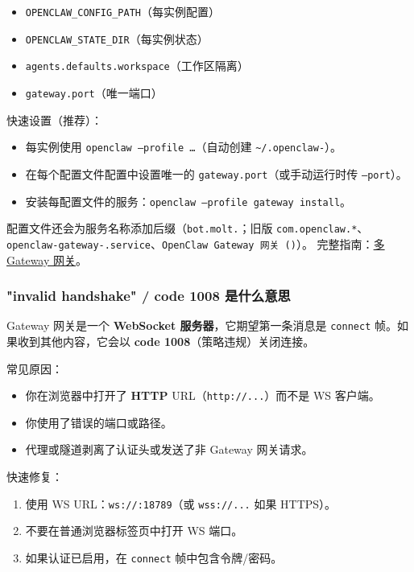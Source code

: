 \begin{itemize}
  \item \texttt{OPENCLAW\_CONFIG\_PATH}（每实例配置）
  \item \texttt{OPENCLAW\_STATE\_DIR}（每实例状态）
  \item \texttt{agents.defaults.workspace}（工作区隔离）
  \item \texttt{gateway.port}（唯一端口）
\end{itemize}


快速设置（推荐）：

\begin{itemize}
  \item 每实例使用 \texttt{openclaw --profile  …}（自动创建 \texttt{\textasciitilde{}/.openclaw-}）。
  \item 在每个配置文件配置中设置唯一的 \texttt{gateway.port}（或手动运行时传 \texttt{--port}）。
  \item 安装每配置文件的服务：\texttt{openclaw --profile  gateway install}。
\end{itemize}


配置文件还会为服务名称添加后缀（\texttt{bot.molt.}；旧版 \texttt{com.openclaw.*}、\texttt{openclaw-gateway-.service}、\texttt{OpenClaw Gateway 网关 ()}）。
完整指南：\href{/gateway/multiple-gateways}{多 Gateway 网关}。

\subsubsection{"invalid handshake" / code 1008 是什么意思}


Gateway 网关是一个 \textbf{WebSocket 服务器}，它期望第一条消息是 \texttt{connect} 帧。如果收到其他内容，它会以 \textbf{code 1008}（策略违规）关闭连接。

常见原因：

\begin{itemize}
  \item 你在浏览器中打开了 \textbf{HTTP} URL（\texttt{http://...}）而不是 WS 客户端。
  \item 你使用了错误的端口或路径。
  \item 代理或隧道剥离了认证头或发送了非 Gateway 网关请求。
\end{itemize}


快速修复：

\begin{enumerate}
  \item 使用 WS URL：\texttt{ws://:18789}（或 \texttt{wss://...} 如果 HTTPS）。
  \item 不要在普通浏览器标签页中打开 WS 端口。
  \item 如果认证已启用，在 \texttt{connect} 帧中包含令牌/密码。
\end{enumerate}


